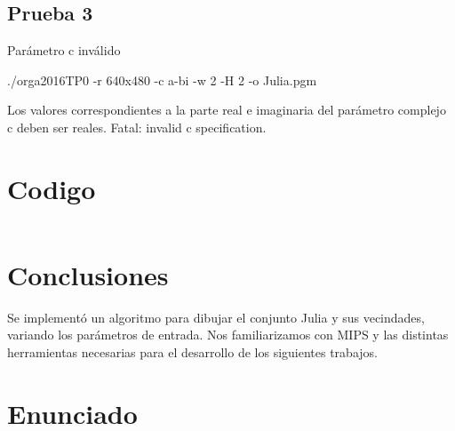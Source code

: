 \documentclass{article}
\begin{document}
\raggedright
\subsection{Prueba 3}
Par\'ametro c inv\'alido
\begin{center}
    ./orga2016TP0 -r 640x480 -c a-bi -w 2 -H 2 -o Julia.pgm\\
\end{center}
Los valores correspondientes a la parte real e imaginaria del par\'ametro complejo c deben ser reales.
\center
Fatal: invalid c specification.

\newpage
\raggedright
\section{Codigo}
\begin{lstlisting}
\end{lstlisting}

\raggedright
\section{Conclusiones}
\indent Se implement\'o un algoritmo para dibujar el conjunto Julia y sus vecindades, variando los par\'ametros de entrada. Nos familiarizamos con MIPS y las distintas herramientas necesarias para el desarrollo de los siguientes trabajos.

\section{Enunciado}

\end{document}
